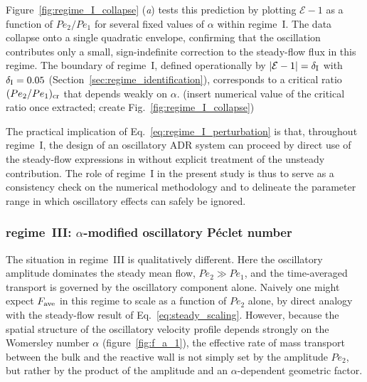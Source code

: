 \documentclass[lineno]{JFM-FLM_Au}
\begin{document}
Figure~\ref{fig:regime_I_collapse} (\textit{a}) tests this prediction by
plotting $\mathcal{E} - 1$ as a function of $Pe_{2}/Pe_{1}$ for several
fixed values of $\alpha$ within regime~I. The data collapse onto a
single quadratic envelope, confirming that the oscillation contributes
only a small, sign-indefinite correction to the steady-flow flux in this
regime. The boundary of regime~I, defined operationally by
$|\mathcal{E} - 1| = \delta_{\rm I}$ with $\delta_{\rm I} = 0.05$
(Section~\ref{sec:regime_identification}), corresponds to a critical
ratio $(Pe_{2}/Pe_{1})_{\rm cr}$ that depends weakly on $\alpha$.
{(insert numerical value of the critical ratio once
extracted; create Fig.~\ref{fig:regime_I_collapse})}
 
The practical implication of Eq.~\eqref{eq:regime_I_perturbation} is
that, throughout regime~I, the design of an oscillatory ADR system can
proceed by direct use of the steady-flow expressions in
\citep{Huang2024} without explicit treatment of the unsteady
contribution. The role of regime~I in the present study is thus to
serve as a consistency check on the numerical methodology and to
delineate the parameter range in which oscillatory effects can safely
be ignored.
 
\subsubsection{regime~III: $\alpha$-modified oscillatory P\'{e}clet number}
\label{sec:regime_III_scaling}
 
The situation in regime~III is qualitatively different. Here the
oscillatory amplitude dominates the steady mean flow,
$Pe_{2} \gg Pe_{1}$, and the time-averaged transport is governed by the
oscillatory component alone. Naively one might expect $F_{\rm ave}$ in
this regime to scale as a function of $Pe_{2}$ alone, by direct analogy
with the steady-flow result of Eq.~\eqref{eq:steady_scaling}. However,
because the spatial structure of the oscillatory velocity profile
depends strongly on the Womersley number $\alpha$
(figure~\ref{fig:f_a_1}), the effective rate of mass transport between
the bulk and the reactive wall is not simply set by the amplitude
$Pe_{2}$, but rather by the product of the amplitude and an
$\alpha$-dependent geometric factor.
 
\end{document}
